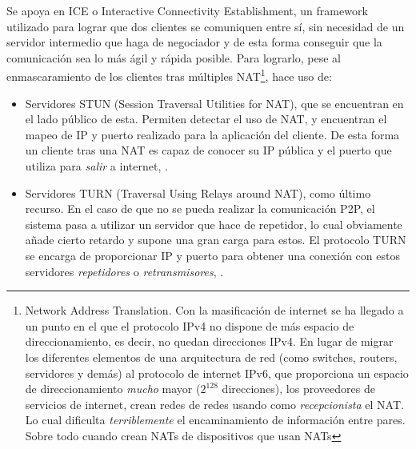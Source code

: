 Se apoya en ICE o Interactive Connectivity Establishment, \citep{wiki:ICE} un framework utilizado para lograr que dos clientes se comuniquen entre sí, sin necesidad de un servidor intermedio que haga de negociador y de esta forma conseguir que la comunicación sea lo más ágil y rápida posible. Para lograrlo, pese al enmascaramiento de los clientes tras múltiples NAT\footnote{Network Address Translation. Con la masificación de internet se ha llegado a un punto en el que el protocolo IPv4 no dispone de más espacio de direccionamiento, es decir, no quedan direcciones IPv4. En lugar de migrar los diferentes elementos de una arquitectura de red (como switches, routers, servidores y demás) al protocolo de internet IPv6, que proporciona un espacio de direccionamiento \emph{mucho} mayor ($2^{128}$ direcciones), los proveedores de servicios de internet, crean redes de redes usando como \textit{recepcionista} el NAT. Lo cual dificulta \emph{terriblemente} el encaminamiento de información entre pares. Sobre todo cuando crean NATs de dispositivos que usan NATs}, hace uso de:
\begin{itemize}
 \item Servidores STUN (Session Traversal Utilities for NAT), que se encuentran en el lado público de esta. Permiten detectar el uso de NAT, y encuentran el mapeo de IP y puerto realizado para la aplicación del cliente. De esta forma un cliente tras una NAT es capaz de conocer su IP pública y el puerto que utiliza para \textit{salir} a internet, \citep{wiki:STUN}.
 \item Servidores TURN (Traversal Using Relays around NAT), como último recurso. En el caso de que no se pueda realizar la comunicación P2P, el sistema pasa a utilizar un servidor que hace de repetidor, lo cual obviamente añade cierto retardo y supone una gran carga para estos. El protocolo TURN se encarga de proporcionar IP y puerto para obtener una conexión con estos servidores \textit{repetidores} o \textit{retransmisores}, \citep{wiki:TURN}.
\end{itemize}


